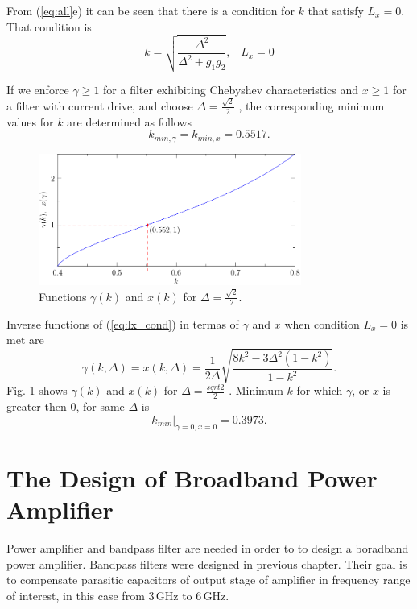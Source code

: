 \documentclass[lettersize,journal]{IEEEtran}
\begin{document}
From (\ref{eq:all}e) it can be seen that there is a condition for $k$ that satisfy $L_x = 0$. That condition is
%
\begin{equation}
	\label{eq:lx_cond}
	k = \sqrt{\frac{\Delta^2}{\Delta^2 + g_1 g_2}}, \,\,\,\,\, L_x = 0
\end{equation}

If we enforce $\gamma \geq 1$ for a filter exhibiting Chebyshev characteristics and $x \geq 1$ for a filter with current drive, and
choose $\Delta = \frac{\sqrt{2}}{2}$ , the corresponding minimum values for $k$ are
determined as follows
%
\begin{equation}
	\label{eq:k_min}
	k_{min, \gamma} = k_{min, x} = 0.5517.
\end{equation}

\begin{figure}[!t]
\centering
\includegraphics[width=3.4in]{./fig/gamma_function.pdf}
\caption{Functions $\gamma(k)$ and $x(k)$ for $\Delta = \frac{\sqrt{2}}{2}$.}
\label{fig:inverse_function_gamma}
\end{figure}

Inverse functions of (\ref{eq:lx_cond}) in termas of $\gamma$ and  $x$ when condition $L_x = 0$ is met are
%
\begin{equation}
	\label{eq:inverse_functions}
	\gamma(k, \Delta) = x(k, \Delta) = \frac{1}{2 \Delta} \sqrt{\frac{8 k^2 - 3  \Delta^2 (1 - k^2)}{1 - k^2}}.
\end{equation}
%
Fig. \ref{fig:inverse_function_gamma} shows $\gamma(k)$ and $x(k)$ for $\Delta = \frac{sqrt{2}}{2}$ . Minimum $k$ for which $\gamma$, or $x$ is greater then $0$, for same $\Delta$ is
%
\begin{equation}
	\label{eq:min_k}
	k_{min}|_{\gamma =0 , x = 0} = 0.3973.
\end{equation}

\section{The Design of Broadband Power Amplifier}

Power amplifier and bandpass filter are needed in order to to design a boradband power amplifier. Bandpass filters were designed in previous chapter. Their goal is to compensate parasitic capacitors of output stage of amplifier in frequency range of interest, in this case from $3 \, \text{GHz}$ to $6 \, \text{GHz}$.
\end{document}
